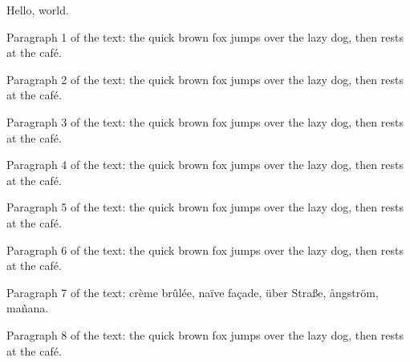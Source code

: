 \documentclass{article}
\begin{document}
Hello, world.

Paragraph 1 of the text: the quick brown fox jumps over the lazy dog, then rests at the café.

Paragraph 2 of the text: the quick brown fox jumps over the lazy dog, then rests at the café.

Paragraph 3 of the text: the quick brown fox jumps over the lazy dog, then rests at the café.

Paragraph 4 of the text: the quick brown fox jumps over the lazy dog, then rests at the café.

Paragraph 5 of the text: the quick brown fox jumps over the lazy dog, then rests at the café.

Paragraph 6 of the text: the quick brown fox jumps over the lazy dog, then rests at the café.

Paragraph 7 of the text: crème brûlée, naïve façade, über Straße, ångström, mañana.

Paragraph 8 of the text: the quick brown fox jumps over the lazy dog, then rests at the café.
\end{document}
